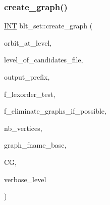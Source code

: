 \subsubsection{\texorpdfstring{create\+\_\+graph()}{create\_graph()}}
{\footnotesize\ttfamily \mbox{\hyperlink{galois_8h_a09fddde158a3a20bd2dcadb609de11dc}{I\+NT}} blt\+\_\+set\+::create\+\_\+graph (\begin{DoxyParamCaption}\item[{\mbox{\hyperlink{galois_8h_a09fddde158a3a20bd2dcadb609de11dc}{I\+NT}}}]{orbit\+\_\+at\+\_\+level,  }\item[{\mbox{\hyperlink{galois_8h_a09fddde158a3a20bd2dcadb609de11dc}{I\+NT}}}]{level\+\_\+of\+\_\+candidates\+\_\+file,  }\item[{const \mbox{\hyperlink{galois_8h_ab6cc7b4aeb6ea31aba2b3fbfc83ff5e6}{B\+Y\+TE}} $\ast$}]{output\+\_\+prefix,  }\item[{\mbox{\hyperlink{galois_8h_a09fddde158a3a20bd2dcadb609de11dc}{I\+NT}}}]{f\+\_\+lexorder\+\_\+test,  }\item[{\mbox{\hyperlink{galois_8h_a09fddde158a3a20bd2dcadb609de11dc}{I\+NT}}}]{f\+\_\+eliminate\+\_\+graphs\+\_\+if\+\_\+possible,  }\item[{\mbox{\hyperlink{galois_8h_a09fddde158a3a20bd2dcadb609de11dc}{I\+NT}} \&}]{nb\+\_\+vertices,  }\item[{\mbox{\hyperlink{galois_8h_ab6cc7b4aeb6ea31aba2b3fbfc83ff5e6}{B\+Y\+TE}} $\ast$}]{graph\+\_\+fname\+\_\+base,  }\item[{\mbox{\hyperlink{classcolored__graph}{colored\+\_\+graph}} $\ast$\&}]{CG,  }\item[{\mbox{\hyperlink{galois_8h_a09fddde158a3a20bd2dcadb609de11dc}{I\+NT}}}]{verbose\+\_\+level }\end{DoxyParamCaption})}

\mbox{\label{classblt__set_a3f1d4a8ed15875c47b327949f26a4533}} 
